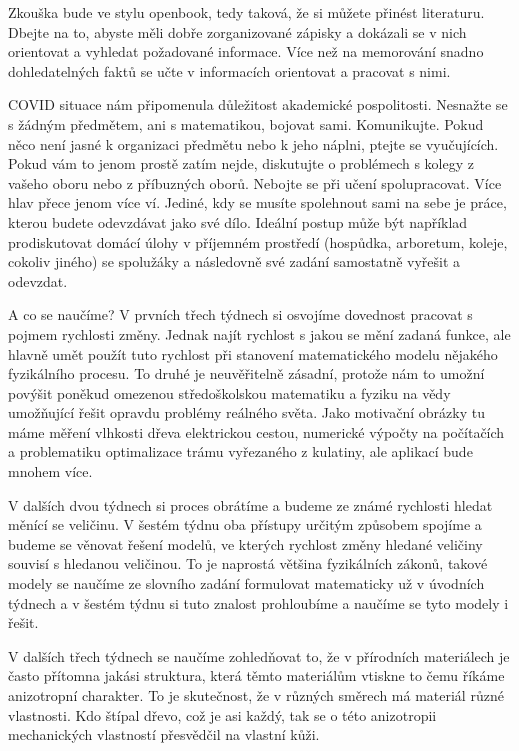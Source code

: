 \documentclass[12pt]{article}
\begin{document}
Zkouška bude ve stylu openbook, tedy taková, že si můžete přinést literaturu. Dbejte na to, abyste měli dobře zorganizované zápisky a dokázali se v nich orientovat a vyhledat požadované informace. Více než na memorování snadno dohledatelných faktů se učte v informacích orientovat a pracovat s nimi.

COVID situace nám připomenula důležitost akademické pospolitosti. Nesnažte se s žádným předmětem, ani s matematikou, bojovat sami. Komunikujte. Pokud něco není jasné k organizaci předmětu nebo  k jeho náplni, ptejte se vyučujících. Pokud vám to jenom prostě zatím nejde, diskutujte o problémech s kolegy z vašeho oboru nebo z příbuzných oborů. Nebojte se při učení spolupracovat. Více hlav přece jenom více ví. Jediné, kdy se musíte spolehnout sami na sebe je práce, kterou budete odevzdávat jako své dílo. Ideální postup může být například prodiskutovat domácí úlohy v příjemném prostředí (hospůdka, arboretum, koleje, cokoliv jiného) se spolužáky a následovně své zadání samostatně vyřešit a odevzdat.

A co se naučíme? V prvních třech týdnech si osvojíme dovednost pracovat s pojmem rychlosti změny. Jednak najít rychlost s jakou se mění zadaná funkce, ale hlavně umět použít tuto rychlost při stanovení matematického modelu nějakého fyzikálního procesu. To druhé je neuvěřitelně zásadní, protože nám to umožní povýšit poněkud omezenou středoškolskou matematiku a fyziku na vědy umožňující řešit opravdu problémy reálného světa. Jako motivační obrázky tu máme měření vlhkosti dřeva elektrickou cestou, numerické výpočty na počítačích a problematiku optimalizace trámu vyřezaného z kulatiny, ale aplikací bude mnohem více.

V dalších dvou týdnech si proces obrátíme a budeme ze známé rychlosti hledat měnící se veličinu. V šestém týdnu  oba přístupy určitým způsobem spojíme a budeme se věnovat řešení modelů, ve kterých rychlost změny hledané veličiny souvisí s hledanou veličinou. To je naprostá většina fyzikálních zákonů, takové modely se naučíme ze slovního zadání formulovat matematicky už v úvodních týdnech a v šestém týdnu si tuto znalost prohloubíme a naučíme se tyto modely i řešit.

V dalších třech týdnech se naučíme zohledňovat to, že v přírodních materiálech je často přítomna jakási struktura, která těmto materiálům vtiskne to čemu říkáme anizotropní charakter. To je skutečnost, že v různých směrech má materiál různé vlastnosti. Kdo štípal dřevo, což je asi každý, tak se o této anizotropii mechanických vlastností přesvědčil na vlastní kůži.
\end{document}
